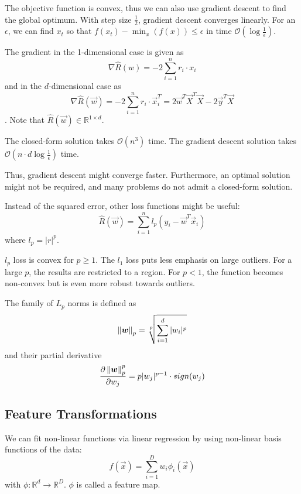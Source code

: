 The objective function is convex, thus we can also use gradient
descent to find the global optimum.
With step size $\frac{1}{2}$,
gradient descent converges linearly.
For an $\epsilon$, we can find $x_t$ so that
$f(x_t) - \min_x(f(x)) \leq \epsilon$ in time
$\mathcal{O}(\log \frac{1}{\epsilon})$.

The gradient in the 1-dimensional case is given as
\begin{equation*}
    \nabla \hat{R}(w)
    = -2 \sum_{i = 1}^n{r_i \cdot x_i}
\end{equation*}
and in the $d$-dimensional case as
\begin{equation*}
    \nabla \hat{R}(\vec{w})
    = -2 \sum_{i = 1}^n{r_i \cdot \vec{x}_i^T}
    = 2 \vec{w}^T \vec{X}^T \vec{X} - 2 \vec{y}^T \vec{X}
\end{equation*}.
Note that $\hat{R}(\vec{w}) \in \mathbb{R}^{1 \times d}$.

The closed-form solution takes $\mathcal{O}(n^3)$ time.
The gradient descent solution takes
$\mathcal{O}(n \cdot d \log \frac{1}{\epsilon})$ time.

Thus, gradient descent might converge faster.
Furthermore, an optimal solution might not be required,
and many problems do not admit a closed-form solution.

Instead of the squared error, other loss functions might be useful:
\begin{equation*}
    \hat{R}(\vec{w}) = \sum_{i = 1}^n{l_p(y_i - \vec{w}^T \vec{x}_i)}
\end{equation*}
where $l_p = |r|^p$.

$l_p$ loss is convex for $p \geq 1$.
The $l_1$ loss puts less emphasis on large outliers.
For a large $p$, the results are restricted to a region.
For $p < 1$, the function becomes non-convex but is even more
robust towards outliers.

The family of $L_p$ norms is defined as
\begin{equation*}
    \left\lVert\boldsymbol{w}\right\rVert_p =
    \sqrt[p]{\sum_{i=1}^d{|w_i|^p}}
\end{equation*}
and their partial derivative
\begin{equation*}
    \frac{\partial \left\lVert\boldsymbol{w}\right\rVert_p^p}{\partial w_j}
    = p |w_j|^{p-1} \cdot sign(w_j)
\end{equation*}


\subsection{Feature Transformations}
We can fit non-linear functions via linear regression
by using non-linear basis functions of the data:
\begin{equation*}
    f(\vec{x}) = \sum_{i=1}^D{w_i \phi_i(\vec{x})}
\end{equation*}
with $\phi : \mathbb{R}^d \to \mathbb{R}^D$.
$\phi$ is called a feature map.

